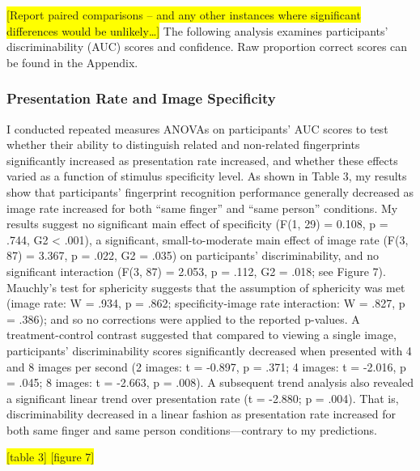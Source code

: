\documentclass[
  english,
  man]{apa6}
\begin{document}
\colorbox{yellow}{[Report paired comparisons – and any other instances where significant differences would be unlikely…]}
The following analysis examines participants' discriminability (AUC) scores and confidence. Raw proportion correct scores can be found in the Appendix.

\hypertarget{presentation-rate-and-image-specificity}{%
\subsubsection{Presentation Rate and Image Specificity}\label{presentation-rate-and-image-specificity}}

I conducted repeated measures ANOVAs on participants' AUC scores to test whether their ability to distinguish related and non-related fingerprints significantly increased as presentation rate increased, and whether these effects varied as a function of stimulus specificity level. As shown in Table 3, my results show that participants' fingerprint recognition performance generally decreased as image rate increased for both ``same finger'' and ``same person'' conditions. My results suggest no significant main effect of specificity (F(1, 29) = 0.108, p = .744, G2 \textless{} .001), a significant, small-to-moderate main effect of image rate (F(3, 87) = 3.367, p = .022, G2 = .035) on participants' discriminability, and no significant interaction (F(3, 87) = 2.053, p = .112, G2 = .018; see Figure 7). Mauchly's test for sphericity suggests that the assumption of sphericity was met (image rate: W = .934, p = .862; specificity-image rate interaction: W = .827, p = .386); and so no corrections were applied to the reported p-values. A treatment-control contrast suggested that compared to viewing a single image, participants' discriminability scores significantly decreased when presented with 4 and 8 images per second (2 images: t = -0.897, p = .371; 4 images: t = -2.016, p = .045; 8 images: t = -2.663, p = .008). A subsequent trend analysis also revealed a significant linear trend over presentation rate (t = -2.880; p = .004). That is, discriminability decreased in a linear fashion as presentation rate increased for both same finger and same person conditions---contrary to my predictions.

\colorbox{yellow}{[table 3]
[figure 7]}
\end{document}
